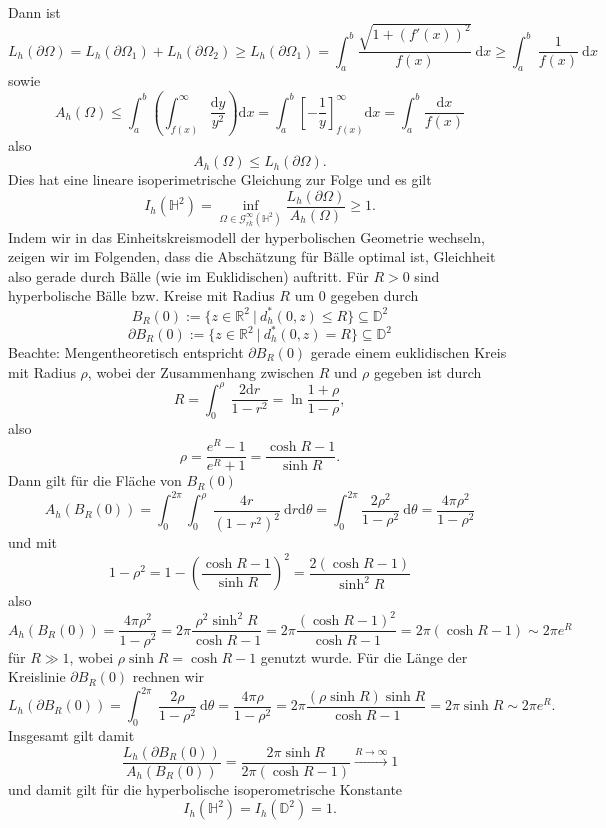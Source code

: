 \documentclass[11pt]{book}
\numberwithin{dummy}{section}
\theoremstyle{nonumberbreak}
\newcommand{\R}{\mathbb{R}}
\newcommand{\He}{\mathbb{H}}
\newcommand{\D}{\mathbb{D}}
\newcommand{\la}{\longrightarrow}
\begin{document}
\begin{spacing}{1.4}
Dann ist
$$L_h(\partial \Omega) = L_h(\partial \Omega_1) + L_h(\partial \Omega_2) \geqslant L_h(\partial \Omega_1) = \int_a^b \frac{ \sqrt{1 + (f'(x))^2}}{f(x)} \ \mathrm{d}x \geqslant \int_a^b \ \frac{1}{f(x)} \ \mathrm{d}x$$
sowie 
$$A_h(\Omega) \leqslant \int_a^b \left(\int_{f(x)}^{\infty} \frac{\mathrm{d}y}{y^2} \right) \mathrm{d}x = \int_a^b \left[ -\frac{1}{y} \right] ^{\infty}_{f(x)} \mathrm{d}x = \int_a^b \frac{\mathrm{d}x}{f(x)}$$
also
$$A_h(\Omega) \leqslant L_h(\partial \Omega).$$
Dies hat eine lineare isoperimetrische Gleichung zur Folge und es gilt 
$$I_h(\He^2) = \inf_{\Omega \in \mathcal{G}_{rk}^{\infty}(\He^2)} \frac{L_h(\partial \Omega)}{A_h(\Omega)} \geqslant 1.$$
Indem wir in das Einheitskreismodell der hyperbolischen Geometrie wechseln, zeigen wir im Folgenden, dass die Abschätzung für Bälle optimal ist, Gleichheit also gerade durch Bälle (wie im Euklidischen) auftritt. Für $R >0$ sind hyperbolische Bälle bzw. Kreise mit Radius $R$ um $0$ gegeben durch 
$$B_R(0) := \{ z \in \R^2 \ \vert \ d_h^*(0,z) \leqslant R \} \subseteq \D^2$$
$$\partial B_R(0) := \{ z \in \R^2 \ \vert \ d_h^*(0,z) = R \} \subseteq \D^2$$
Beachte: Mengentheoretisch entspricht $\partial B_R(0)$ gerade einem euklidischen Kreis mit Radius $\rho$, wobei der Zusammenhang zwischen $R$ und $\rho$ gegeben ist durch 
$$R= \int_0^{\rho}  \ \frac{2 \mathrm{d}r}{1-r^2} = \ln \frac{1+\rho}{1-\rho},$$
also 
$$\rho= \frac{e^R-1}{e^R+1} = \frac{\cosh R-1}{\sinh R}.$$
Dann gilt für die Fläche von $B_R(0)$
$$A_h(B_R(0)) = \int_{0}^{2\pi} \int_0^{\rho} \ \frac{4r}{(1-r^2)^2} \ \mathrm{d}r \mathrm{d} \theta = \int_0^{2 \pi} \frac{2\rho^2}{1-\rho^2} \ \mathrm{d}\theta = \frac{4\pi \rho^2}{1-\rho^2}$$
und mit 
$$1-\rho^2 = 1-\left( \frac{\cosh R -1}{\sinh R}\right)^2 = \frac{2 (\cosh R -1 )}{\sinh^2 R}$$
also 
$$A_h(B_R(0)) = \frac{4 \pi \rho^2}{1 - \rho^2} = 2\pi \frac{\rho^2 \sinh^2R}{\cosh R-1} = 2\pi \frac{(\cosh R-1)^2}{\cosh R-1} = 2\pi ( \cosh R-1) \sim 2\pi e^R$$
für $R \gg1$, wobei $\rho \sinh R = \cosh R - 1$ genutzt wurde. Für die Länge der Kreislinie $\partial B_R(0)$ rechnen wir
$$L_h(\partial B_R(0)) = \int_0^{2 \pi} \ \frac{2 \rho}{1-\rho^2} \ \mathrm{d} \theta = \frac{4 \pi \rho}{1-\rho^2} = 2 \pi \frac{(\rho \sinh R )\sinh R}{\cosh R -1} = 2\pi \sinh R \sim 2 \pi e^R.$$
Insgesamt gilt damit 
$$\frac{L_h(\partial B_R(0))}{A_h(B_R(0))} = \frac{2 \pi \sinh R}{2 \pi (\cosh R-1)} \overset{R \to \infty}{\la}1$$
und damit gilt für die hyperbolische isoperometrische Konstante
$$I_h(\He^2) = I_h(\D^2) = 1.$$



\end{spacing}
\end{document}
